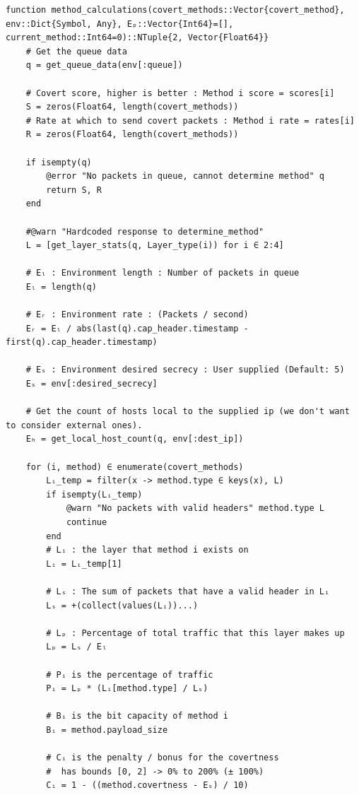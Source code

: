\begin{lstlisting}[language=JuliaLocal, style=julia]
function method_calculations(covert_methods::Vector{covert_method}, env::Dict{Symbol, Any}, Eₚ::Vector{Int64}=[], current_method::Int64=0)::NTuple{2, Vector{Float64}}
    # Get the queue data
    q = get_queue_data(env[:queue])

    # Covert score, higher is better : Method i score = scores[i]
    S = zeros(Float64, length(covert_methods))
    # Rate at which to send covert packets : Method i rate = rates[i]
    R = zeros(Float64, length(covert_methods))
    
    if isempty(q)
        @error "No packets in queue, cannot determine method" q
        return S, R
    end
    
    #@warn "Hardcoded response to determine_method"
    L = [get_layer_stats(q, Layer_type(i)) for i ∈ 2:4]

    # Eₗ : Environment length : Number of packets in queue
    Eₗ = length(q)

    # Eᵣ : Environment rate : (Packets / second)
    Eᵣ = Eₗ / abs(last(q).cap_header.timestamp - first(q).cap_header.timestamp)

    # Eₛ : Environment desired secrecy : User supplied (Default: 5)
    Eₛ = env[:desired_secrecy]

    # Get the count of hosts local to the supplied ip (we don't want to consider external ones).
    Eₕ = get_local_host_count(q, env[:dest_ip])

    for (i, method) ∈ enumerate(covert_methods)
        Lᵢ_temp = filter(x -> method.type ∈ keys(x), L)
        if isempty(Lᵢ_temp)
            @warn "No packets with valid headers" method.type L
            continue
        end
        # Lᵢ : the layer that method i exists on
        Lᵢ = Lᵢ_temp[1]

        # Lₛ : The sum of packets that have a valid header in Lᵢ
        Lₛ = +(collect(values(Lᵢ))...)

        # Lₚ : Percentage of total traffic that this layer makes up
        Lₚ = Lₛ / Eₗ

        # Pᵢ is the percentage of traffic 
        Pᵢ = Lₚ * (Lᵢ[method.type] / Lₛ)

        # Bᵢ is the bit capacity of method i
        Bᵢ = method.payload_size

        # Cᵢ is the penalty / bonus for the covertness
        #  has bounds [0, 2] -> 0% to 200% (± 100%)
        Cᵢ = 1 - ((method.covertness - Eₛ) / 10)


\end{lstlisting}
